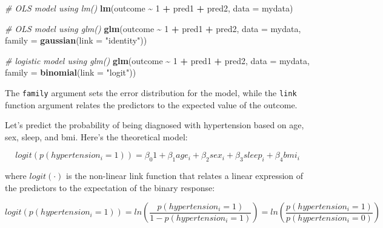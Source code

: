 \documentclass[
]{book}
\newenvironment{Shaded}{\begin{snugshade}}{\end{snugshade}}
\newcommand{\CommentTok}[1]{\textcolor[rgb]{0.56,0.35,0.01}{\textit{#1}}}
\newcommand{\DataTypeTok}[1]{\textcolor[rgb]{0.13,0.29,0.53}{#1}}
\newcommand{\DecValTok}[1]{\textcolor[rgb]{0.00,0.00,0.81}{#1}}
\newcommand{\KeywordTok}[1]{\textcolor[rgb]{0.13,0.29,0.53}{\textbf{#1}}}
\newcommand{\NormalTok}[1]{#1}
\newcommand{\OperatorTok}[1]{\textcolor[rgb]{0.81,0.36,0.00}{\textbf{#1}}}
\newcommand{\StringTok}[1]{\textcolor[rgb]{0.31,0.60,0.02}{#1}}
\begin{document}
\begin{Shaded}
\begin{Highlighting}[]
  \CommentTok{\# OLS model using lm()}
  \KeywordTok{lm}\NormalTok{(outcome }\OperatorTok{\textasciitilde{}}\StringTok{ }\DecValTok{1} \OperatorTok{+}\StringTok{ }\NormalTok{pred1 }\OperatorTok{+}\StringTok{ }\NormalTok{pred2, }
     \DataTypeTok{data =}\NormalTok{ mydata)}

  \CommentTok{\# OLS model using glm()}
  \KeywordTok{glm}\NormalTok{(outcome }\OperatorTok{\textasciitilde{}}\StringTok{ }\DecValTok{1} \OperatorTok{+}\StringTok{ }\NormalTok{pred1 }\OperatorTok{+}\StringTok{ }\NormalTok{pred2, }
      \DataTypeTok{data =}\NormalTok{ mydata, }
      \DataTypeTok{family =} \KeywordTok{gaussian}\NormalTok{(}\DataTypeTok{link =} \StringTok{"identity"}\NormalTok{))}
 
  \CommentTok{\# logistic model using glm()}
  \KeywordTok{glm}\NormalTok{(outcome }\OperatorTok{\textasciitilde{}}\StringTok{ }\DecValTok{1} \OperatorTok{+}\StringTok{ }\NormalTok{pred1 }\OperatorTok{+}\StringTok{ }\NormalTok{pred2, }
      \DataTypeTok{data =}\NormalTok{ mydata, }
      \DataTypeTok{family =} \KeywordTok{binomial}\NormalTok{(}\DataTypeTok{link =} \StringTok{"logit"}\NormalTok{))}
\end{Highlighting}
\end{Shaded}

The \texttt{family} argument sets the error distribution for the model, while the \texttt{link} function argument relates the predictors to the expected value of the outcome.

Let's predict the probability of being diagnosed with hypertension based on age, sex, sleep, and bmi. Here's the theoretical model:

\begin{alert}

\[
logit(p(hypertension_i = 1)) = \beta_{0}1 + \beta_1age_i + \beta_2sex_i + \beta_3sleep_i + \beta_4bmi_i 
\]

\end{alert}

where \(logit(\cdot)\) is the non-linear link function that relates a linear expression of the predictors to the expectation of the binary response:

\begin{alert}

\[
logit(p(hypertension_i = 1)) = ln \left( \frac{p(hypertension_i = 1)}{1-p(hypertension_i = 1)} \right) = ln \left( \frac{p(hypertension_i = 1)}{p(hypertension_i = 0)} \right)
\]

\end{alert}
\end{document}
